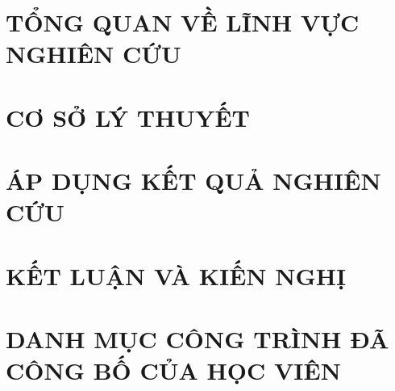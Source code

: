 \documentclass[12pt, a4paper, oneside]{report}
\renewcommand{\bibname}{TÀI LIỆU THAM KHẢO}
\renewcommand{\bibname}{TÀI LIỆU THAM KHẢO}%
\renewcommand{\bibname}{TÀI LIỆU THAM KHẢO}%
\begin{document}
\chapter{TỔNG QUAN VỀ LĨNH VỰC NGHIÊN CỨU}


\chapter{CƠ SỞ LÝ THUYẾT}


\chapter{ÁP DỤNG KẾT QUẢ NGHIÊN CỨU}


\chapter*{KẾT LUẬN VÀ KIẾN NGHỊ}


\chapter*{DANH MỤC CÔNG TRÌNH ĐÃ CÔNG BỐ CỦA HỌC VIÊN}


\renewcommand{\bibsection}{%
  \chapter*{\bibname}
  \addcontentsline{toc}{chapter}{\bibname}
}

\end{document}
